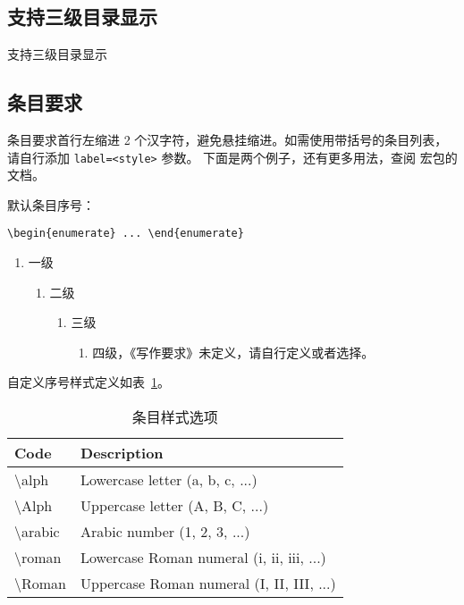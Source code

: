 \subsection{支持三级目录显示}

支持三级目录显示


\subsection{条目要求}

条目要求首行左缩进 2 个汉字符，避免悬挂缩进。如需使用带括号的条目列表，请自行添加 \verb|label=<style>| 参数。
下面是两个例子，还有更多用法，查阅  宏包的文档。

默认条目序号：

\verb|\begin{enumerate} ... \end{enumerate}|

\begin{enumerate}
  \item 一级
  \begin{enumerate}
    \item 二级
    \begin{enumerate}
      \item 三级
      \begin{enumerate}
        \item 四级，《写作要求》未定义，请自行定义或者选择。
      \end{enumerate}
    \end{enumerate}
  \end{enumerate}
\end{enumerate}

自定义序号样式定义如表~\ref{tab:enum-style}。

\begin{table}[h]
  \centering
  \caption{条目样式选项}
  \label{tab:enum-style}
  \begin{tabular}{@{}ll@{}}
  \toprule
  \textbf{Code}          & \textbf{Description}                      \\ \midrule
  \textbackslash{}alph   & Lowercase letter (a, b, c, ...)           \\
  \textbackslash{}Alph   & Uppercase letter (A, B, C, ...)           \\
  \textbackslash{}arabic & Arabic number (1, 2, 3, ...)              \\
  \textbackslash{}roman  & Lowercase Roman numeral (i, ii, iii, ...) \\
  \textbackslash{}Roman  & Uppercase Roman numeral (I, II, III, ...) \\ \bottomrule
  \end{tabular}
\end{table}

